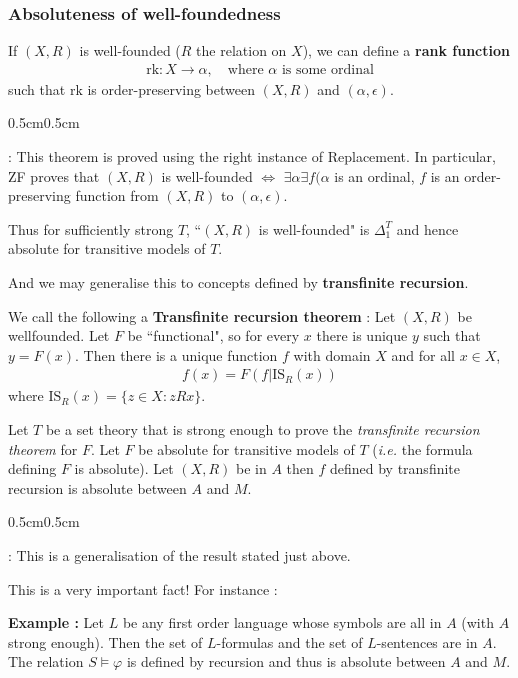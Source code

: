 \documentclass[12pt,a4paper]{article}
\newenvironment{proof}
{\begin{changemargin}{0.5cm}{0.5cm} 
	}%
	{\end{changemargin}
}
\newenvironment{p}
{\begin{proof} 
	}%
	{\end{proof}
}
\begin{document}
\subsubsection*{Absoluteness of well-foundedness}

If $(X, R)$ is well-founded ($R$ the relation on $X$), we can define a \textbf{rank function}
\begin{align*}
\text{rk} : X \rightarrow \alpha, \quad \text{where } \alpha \text{ is some ordinal}
\end{align*}
such that $\text{rk}$ is order-preserving between $(X,R)$ and $(\alpha, \epsilon)$.
\begin{p}
: This theorem is proved using the right instance of Replacement. In particular, ZF proves that $(X, R)$ is well-founded $\Leftrightarrow$ $\exists \alpha \exists f (\alpha$ is an ordinal, $f$ is an order-preserving function from $(X, R)$ to $(\alpha, \epsilon)$.

\quad Thus for sufficiently strong $T$, ``$(X, R)$ is well-founded" is $\Delta_1^T$ and hence absolute for transitive models of $T$.
\end{p}
And we may generalise this to concepts defined by \textbf{transfinite recursion}.
\s

 We call the following a \textbf{Transfinite recursion theorem} : Let $(X,R)$ be wellfounded. Let $F$ be ``functional", so for every $x$ there is unique $y$ such that $y = F(x)$. Then there is a unique function $f$ with domain $X$ and for all $x\in X$,
\begin{align*}
f(x) = F(f | \text{IS}_R(x))
\end{align*}
where $\text{IS}_R(x) = \{ z\in X : zRx \}$.
\s

\prop Let $T$ be a set theory that is strong enough to prove the \emph{transfinite recursion theorem} for $F$. Let $F$ be absolute for transitive models of $T$ (\textit{i.e.} the formula defining $F$ is absolute). Let $(X, R)$ be in $A$ then $f$ defined by transfinite recursion is absolute between $A$ and $M$.
\begin{p}
: This is a generalisation of the result stated just above.
\end{p}
\s

This is a very important fact! For instance :
\s

\textbf{Example :} Let $L$ be any first order language whose symbols are all in $A$ (with $A$ strong enough). Then the set of $L$-formulas and the set of $L$-sentences are in $A$. The relation $S\models \varphi$ is defined by recursion and thus is absolute between $A$ and $M$.
\end{document}

